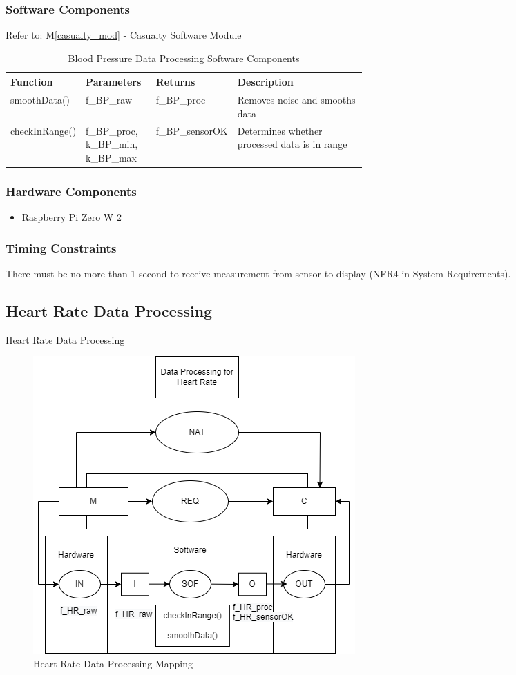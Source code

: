 \documentclass{article}
\newcounter{mnum}
\newcommand{\mthemnum}{M\themnum}
\begin{document}
\begin{description}
        \subsubsection{Software Components}
        Refer to: M\ref{casualty_mod} - Casualty Software Module
                \begin{longtable}{|l|p{0.2\linewidth}|l|p{0.4\linewidth}|}
                \caption{Blood Pressure Data Processing Software Components}
                \hline
                \textbf{Function} & \textbf{Parameters} & \textbf {Returns} & \textbf{Description} \\
                \endhead
                \hline
                smoothData()   & f\_BP\_raw & f\_BP\_proc & Removes noise and smooths data \\
                \hline
                checkInRange() & f\_BP\_proc, k\_BP\_min, k\_BP\_max & f\_BP\_sensorOK & Determines whether processed data is in range \\
                \hline
                \end{longtable}
            \noindent
        \subsubsection{Hardware Components}
            \begin{itemize}
            \item Raspberry Pi Zero W 2
            \end{itemize}
        \subsubsection{Timing Constraints}
        There must be no more than 1 second to receive measurement from sensor to display (NFR4 in System Requirements).
    \newpage

    \subsection{Heart Rate Data Processing}
    \item [\refstepcounter{mnum} \mthemnum \label{HR_DP}:] Heart Rate Data Processing
    
    \begin{figure}[!htb]
    	\centering
    	\includegraphics[width=0.5\linewidth]{mccharts-HRDataProc.drawio.png}
    	\caption{Heart Rate Data Processing Mapping}
    \end{figure}
    

\end{description}
\end{document}
